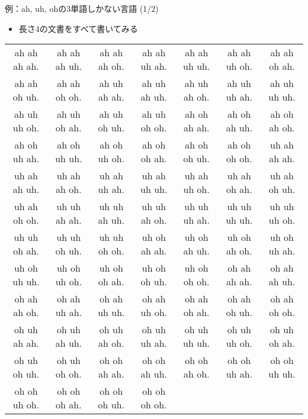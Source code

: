 \documentclass[aspectratio=169,unicode,dvipdfmx,14pt]{beamer}
\begin{document}
\begin{frame}{例：ah, uh, ohの3単語しかない言語 (1/2)}
\begin{itemize}
\item 長さ4の文書をすべて書いてみる
\end{itemize}
\begin{table}[t]
\begin{center}
\scriptsize
\begin{tabular}{ccccccc}
ah ah ah ah.  & ah ah ah uh.  & ah ah ah oh.  & ah ah uh ah.  & ah ah uh uh.  & ah ah uh oh.  & ah ah oh ah. \\
ah ah oh uh.  & ah ah oh oh.  & ah uh ah ah.  & ah uh ah uh.  & ah uh ah oh.  & ah uh uh ah.  & ah uh uh uh. \\
ah uh uh oh.  & ah uh oh ah.  & ah uh oh uh.  & ah uh oh oh.  & ah oh ah ah.  & ah oh ah uh.  & ah oh ah oh. \\
ah oh uh ah.  & ah oh uh uh.  & ah oh uh oh.  & ah oh oh ah.  & ah oh oh uh.  & ah oh oh oh.  & uh ah ah ah. \\
uh ah ah uh.  & uh ah ah oh.  & uh ah uh ah.  & uh ah uh uh.  & uh ah uh oh.  & uh ah oh ah.  & uh ah oh uh. \\
uh ah oh oh.  & uh uh ah ah.  & uh uh ah uh.  & uh uh ah oh.  & uh uh uh ah.  & uh uh uh uh.  & uh uh uh oh. \\
uh uh oh ah.  & uh uh oh uh.  & uh uh oh oh.  & uh oh ah ah.  & uh oh ah uh.  & uh oh ah oh.  & uh oh uh ah. \\
uh oh uh uh.  & uh oh uh oh.  & uh oh oh ah.  & uh oh oh uh.  & uh oh oh oh.  & oh ah ah ah.  & oh ah ah uh. \\
oh ah ah oh.  & oh ah uh ah.  & oh ah uh uh.  & oh ah uh oh.  & oh ah oh ah.  & oh ah oh uh.  & oh ah oh oh. \\
oh uh ah ah.  & oh uh ah uh.  & oh uh ah oh.  & oh uh uh ah.  & oh uh uh uh.  & oh uh uh oh.  & oh uh oh ah. \\
oh uh oh uh.  & oh uh oh oh.  & oh oh ah ah.  & oh oh ah uh.  & oh oh ah oh.  & oh oh uh ah.  & oh oh uh uh. \\
oh oh uh oh.  & oh oh oh ah.  & oh oh oh uh.  & oh oh oh oh.  & & & 
\end{tabular}
\end{center}
\label{tbl:multinomial_ex}
\end{table}
\end{frame}
\end{document}
